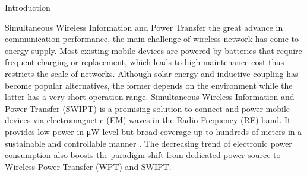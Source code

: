 \documentclass[journal]{IEEEtran}
\begin{document}
	\begin{section}{Introduction}
		\begin{subsection}{Simultaneous Wireless Information and Power Transfer}
			 the great advance in communication performance, the main challenge of wireless network has come to energy supply. Most existing mobile devices are powered by batteries that require frequent charging or replacement, which leads to high maintenance cost thus restricts the scale of networks. Although solar energy and inductive coupling has become popular alternatives, the former depends on the environment while the latter has a very short operation range. Simultaneous Wireless Information and Power Transfer (SWIPT) is a promising solution to connect and power mobile devices via electromagnetic (EM) waves in the Radio-Frequency (RF) band. It provides low power in \si{\uW} level but broad coverage up to hundreds of meters in a sustainable and controllable manner \cite{Ng2018}. The decreasing trend of electronic power consumption also boosts the paradigm shift from dedicated power source to Wireless Power Transfer (WPT) and SWIPT.


\end{subsection}
\end{section}
\end{document}

